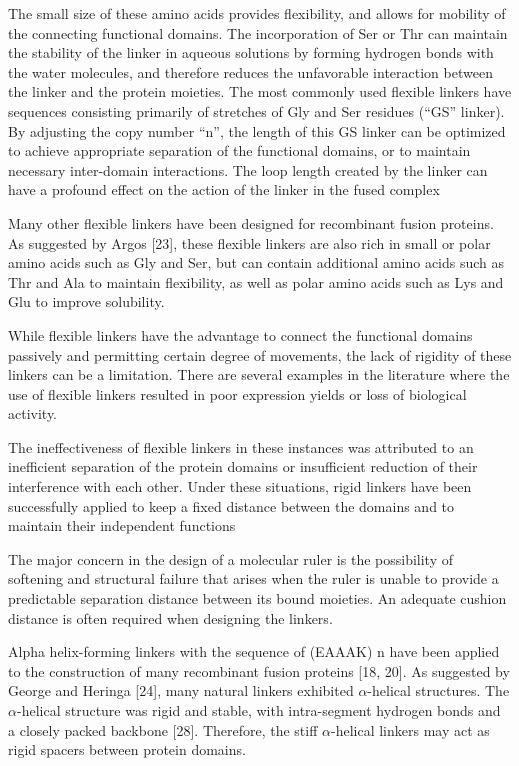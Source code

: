 The small size of these amino acids provides flexibility, and allows for mobility of the connecting functional domains. 
The incorporation of Ser or Thr can maintain the stability of the linker in aqueous solutions by forming hydrogen bonds with the water molecules, and therefore reduces the unfavorable interaction between the linker and the protein moieties.
The most commonly used flexible linkers have sequences consisting primarily of stretches of Gly and Ser residues (“GS” linker). 
By adjusting the copy number “n”, the length of this GS linker can be optimized to achieve appropriate separation of the functional domains, or to maintain necessary inter-domain interactions.
The loop length created by the linker can have a profound effect on the action of the linker in the fused complex

Many other flexible linkers have been designed for recombinant fusion proteins. As suggested by Argos [23], these flexible linkers are also rich in small or polar amino acids such as Gly and Ser, but can contain additional amino acids such as Thr and Ala to maintain flexibility, as
well as polar amino acids such as Lys and Glu to improve solubility.



While flexible linkers have the advantage to connect the functional domains passively and
permitting certain degree of movements, the lack of rigidity of these linkers can be a
limitation. There are several examples in the literature where the use of flexible linkers
resulted in poor expression yields or loss of biological activity.

The ineffectiveness of flexible linkers in these
instances was attributed to an inefficient separation of the protein domains or insufficient
reduction of their interference with each other. Under these situations, rigid linkers have
been successfully applied to keep a fixed distance between the domains and to maintain their
independent functions

The major concern in the design of a molecular ruler is the possibility of softening and structural failure that arises when the ruler is unable to provide a predictable separation distance between its bound
moieties. An adequate cushion distance is often required when designing the linkers.

Alpha helix-forming linkers with the sequence of (EAAAK) n have been applied to the
construction of many recombinant fusion proteins [18, 20]. As suggested by George and
Heringa [24], many natural linkers exhibited $\alpha$-helical structures. The $\alpha$-helical structure
was rigid and stable, with intra-segment hydrogen bonds and a closely packed backbone
[28]. Therefore, the stiff $\alpha$-helical linkers may act as rigid spacers between protein domains.


